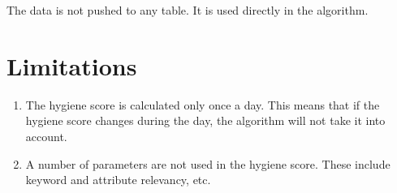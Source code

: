 \begin{outline}
    The data is not pushed to any table. It is used directly in the algorithm.
\end{outline}

\section{Limitations}

\begin{enumerate}
    \item The hygiene score is calculated only once a day. This means that if the hygiene score changes during the day, the algorithm will not take it into account.
    \item A number of parameters are not used in the hygiene score. These include keyword and attribute relevancy, etc.
\end{enumerate}